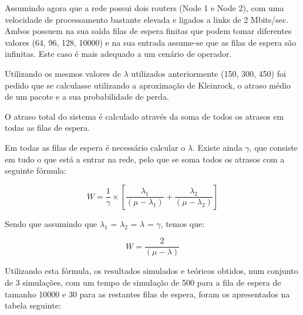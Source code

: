 \documentclass[pdftex,12pt,a4paper]{report}
\begin{document}
Assumindo agora que a rede possui dois routers (Node 1 e Node 2), com uma velocidade de processamento bastante elevada e ligados a links de 2 Mbits/sec. Ambos possuem na sua saída filas de espera finitas que podem tomar diferentes valores (64, 96, 128, 10000) e na sua entrada assume-se que as filas de espera são infinitas. Este caso é mais adequado a um cenário de operador.

Utilizando os mesmos valores de $\lambda$ utilizados anteriormente (150, 300, 450) foi pedido que se calculasse utilizando a aproximação de Kleinrock, o atraso médio de um pacote e a sua probabilidade de perda.

O atraso total do sistema é calculado através da soma de todos os atrasos em todas as filas de espera.

Em todas as filas de espera é necessário calcular o $\lambda$. Existe ainda $\gamma$, que consiste em tudo o que está a entrar na rede, pelo que se soma todos os atrasos com a seguinte fórmula:

\[W = \frac{1}{\gamma}\times\left[\frac{\lambda_{1}}{\left(\mu-\lambda_{1}\right)}+\frac{\lambda_{2}}{\left(\mu-\lambda_{2}\right)}\right]\]

Sendo que assumindo que  $\lambda_{1}$ = $\lambda_{2}$ = $\lambda$ = $\gamma$, temos que:

\[W = \frac{2}{\left(\mu-\lambda\right)}\]

\newpage
Utilizando esta fórmula, os resultados simulados e teóricos obtidos, num conjunto de 3 simulações, com um tempo de simulação de 500 para a fila de espera de tamanho 10000 e 30 para as restantes filas de espera, foram os apresentados na tabela seguinte:
\end{document}
